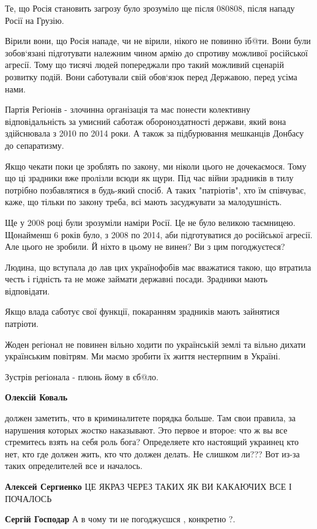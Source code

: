 \begin{itemize}
\begin{itemize}
Те, що Росія становить загрозу було зрозуміло ще після 080808, після нападу Росії на Грузію.

Вірили вони, що Росія нападе, чи не вірили, нікого не повинно їб@ти. Вони були
зобов`язані підготувати належним чином армію до спротиву можливої російської
агресії. Тому що тисячі людей попереджали про такий можливий сценарій розвитку
подій. Вони саботували свій обов`язок перед Державою, перед усіма нами.

Партія Регіонів - злочинна організація та має понести колективну
відповідальність за умисний саботаж обороноздатності держави, який вона
здійснювала з 2010 по 2014 роки. А також за підбурювання мешканців Донбасу до
сепаратизму.

Якщо чекати поки це зроблять по закону, ми ніколи цього не дочекаємося. Тому що
ці зрадники вже пролізли всюди як щури. Під час війни зрадників в тилу потрібно
позбавлятися в будь-який спосіб. А таких "патріотів", хто їм співчуває, каже,
що тільки по закону треба, всі мають засуджувати за малодушність.

Ще у 2008 році були зрозуміли наміри Росії. Це не було великою таємницею.
Щонайменш 6 років було, з 2008 по 2014, аби підготуватися до російської
агресії. Але цього не зробили. Й ніхто в цьому не винен? Ви з цим погоджуєтеся?

Людина, що вступала до лав цих українофобів має вважатися такою, що втратила
честь і гідність та не може займати державні посади. Зрадники мають
відповідати.

Якщо влада саботує свої функції, покаранням зрадників мають зайнятися патріоти.

Жоден регіонал не повинен вільно ходити по українській землі та вільно дихати
українським повітрям. Ми маємо зробити їх життя нестерпним в Україні.

Зустрів регіонала - плюнь йому в єб@ло.

\textbf{Олексій Коваль} 

должен заметить, что в криминалитете порядка больше. Там свои правила, за
нарушения которых жостко наказывают. Это первое и второе: что ж вы все
стремитесь взять на себя роль бога? Определяете кто настоящий украинец кто нет,
кто где должен жить, кто что должен делать. Не слишком ли??? Вот из-за таких
определителей все и началось.

\textbf{Алексей Сергиенко} ЦЕ ЯКРАЗ ЧЕРЕЗ ТАКИХ ЯК ВИ КАКАЮЧИХ ВСЕ І ПОЧАЛОСЬ

\textbf{Сергій Господар} А в чому ти не погоджуєшся , конкретно ?.


\end{itemize}
\end{itemize}
